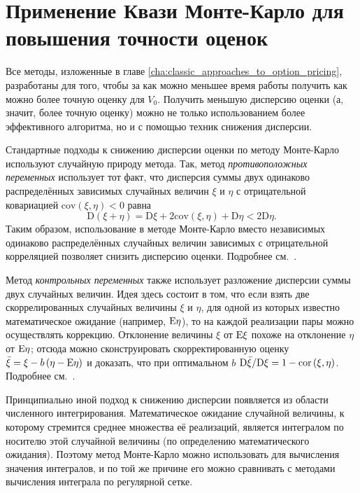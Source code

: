 \chapter{Применение Квази Монте-Карло для повышения точности оценок} %
\label{cha:QMC_for_variance_reduction}

Все методы, изложенные в главе \ref{cha:classic_approaches_to_option_pricing}, разработаны для того, чтобы за как можно меньшее время работы получить как можно более точную оценку для $V_0$. Получить меньшую дисперсию оценки (а, значит, более точную оценку) можно не только использованием более эффективного алгоритма, но и с помощью техник снижения дисперсии. 

Стандартные подходы к снижению дисперсии оценки по методу Монте-Карло используют случайную природу метода. Так, метод \emph{противоположных переменных} использует тот факт, что дисперсия суммы двух одинаково распределённых зависимых случайных величин $\xi$ и $\eta$ с отрицательной ковариацией $\mathrm{cov}\left(\xi, \eta\right) < 0$ равна 
$$\mathrm D\left(\xi + \eta\right) = \mathrm D \xi + 2 \mathrm{cov}\left(\xi, \eta\right) + \mathrm D\eta < 2 \mathrm D\eta.$$
Таким образом, использование в методе Монте-Карло вместо независимых одинаково распределённых случайных величин зависимых с отрицательной корреляцией позволяет снизить дисперсию оценки. Подробнее см.~\cite[раздел~4.2, стр.~205]{Glasserman2004}.

Метод \emph{контрольных переменных} также использует разложение дисперсии суммы двух случайных величин. Идея здесь состоит в том, что если взять две скоррелированных случайных величины $\xi$ и $\eta$, для одной из которых известно математическое ожидание (например, $\mathrm{E}\eta$), то на каждой реализации пары можно осуществлять коррекцию. Отклонение величины $\xi$ от $\mathrm{E}\xi$ похоже на отклонение $\eta$ от $\mathrm{E}\eta$; отсюда можно сконструировать скорректированную оценку $\bar\xi = \xi - b\left(\eta - \mathrm{E}\eta\right)$ и доказать, что при оптимальном $b$ $\mathrm D \bar\xi / \mathrm D\xi = 1 - \operatorname{cor}\left(\xi, \eta\right)$. Подробнее см.~\cite[раздел~4.1, стр.~185]{Glasserman2004}.

Принципиально иной подход к снижению дисперсии появляется из области численного интегрирования. Математическое ожидание случайной величины, к которому стремится среднее множества её реализаций, является интегралом по носителю этой случайной величины (по определению математического ожидания). Поэтому метод Монте-Карло можно использовать для вычисления значения интегралов, и по той же причине его можно сравнивать с методами вычисления интеграла по регулярной сетке.

